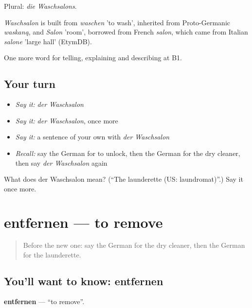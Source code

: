 Plural: \emph{die Waschsalons}.

\begin{cousinweb}
\emph{Waschsalon} is built from \emph{waschen} 'to wash', inherited from Proto-Germanic \emph{waskaną}, and \emph{Salon} 'room', borrowed from French \emph{salon}, which came from Italian \emph{salone} 'large hall' (EtymDB).
\end{cousinweb}

\begin{grammarlens}[title={What you've built}]
One more word for telling, explaining and describing at B1.
\end{grammarlens}

\subsection*{Your turn}
\begin{itemize}
\raggedright
  \item \emph{Say it:} \emph{der Waschsalon}
  \item \emph{Say it:} \emph{der Waschsalon}, once more
  \item \emph{Say it:} a sentence of your own with \emph{der Waschsalon}
  \item \emph{Recall:} say the German for to unlock, then the German for the dry cleaner, then say \emph{der Waschsalon} again
\end{itemize}

\begin{tcolorbox}[breakable,colback=teal!4,colframe=teal!35!black,title={Before you move on}]
What does der Waschsalon mean? (\textquotedblleft{}The launderette (US: laundromat)\textquotedblright{}.) Say it once more.
\end{tcolorbox}
\section[entfernen]{entfernen — to remove}

\label{lesson:GE-C446-entfernen}



\begin{quote}
Before the new one: say the German for the dry cleaner, then the German for the launderette.
\end{quote}

\subsection*{You'll want to know: entfernen}
\textbf{entfernen} — \textquotedblleft{}to remove\textquotedblright{}.


